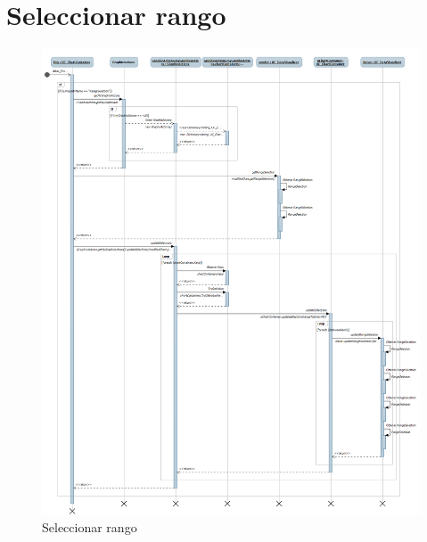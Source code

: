 \section{Seleccionar rango}
\begin{figure}[H]
\centering
\includegraphics[width=0.9\linewidth]{./Figures/Secuencia/RangeSelectionPropertyChanged}
\caption{Seleccionar rango}
\label{fig:RangeSelectionPropertyChanged}
\end{figure}


